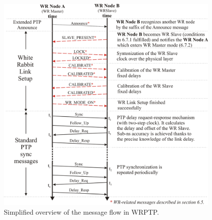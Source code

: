\documentclass[a4paper, 12pt]{article}
\begin{document}
\begin{figure}[ht!]
  \centering
  \includegraphics[width=0.99\textwidth]{protocol/wrptpMSGs_1.pdf}
  \caption{Simplified overview of the message flow in WRPTP.}
  \label{fig:wrptpMSGs}
\end{figure}

\newpage 
\end{document}
